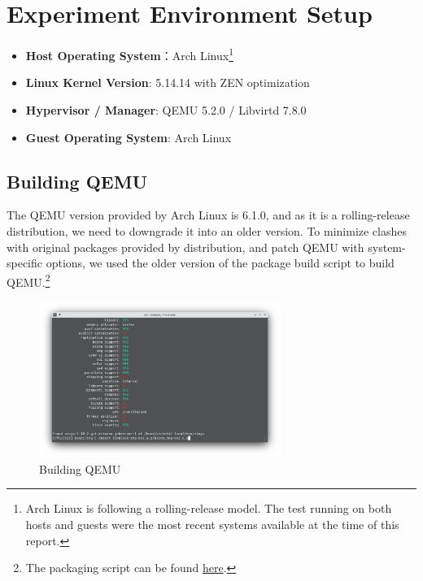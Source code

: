 \section{Experiment Environment Setup}

\begin{itemize}
    \item \textbf{Host Operating System}：Arch Linux\footnote{Arch Linux is following a rolling-release model. The test running on both hosts and guests were the most recent systems available at the time of this report.}
    \item \textbf{Linux Kernel Version}: 5.14.14 with ZEN optimization
    \item \textbf{Hypervisor / Manager}: QEMU 5.2.0 / Libvirtd 7.8.0
    \item \textbf{Guest Operating System}: Arch Linux
\end{itemize}

\subsection*{Building QEMU}

The QEMU version provided by Arch Linux is 6.1.0, and as it is a rolling-release distribution, we need to downgrade it into an older version. To minimize clashes with original packages provided by distribution, and patch QEMU with system-specific options, we used the older version of the package build script to build QEMU.\footnote{The packaging script can be found  \textcolor{blue}{\href{https://github.com/archlinux/svntogit-packages/tree/3049c9e5bcef3221532391bc719d07e9a4386a25}{here}}.}

\begin{figure}[ht]
    \centering
    \includegraphics[width=0.7\textwidth]{images/compiling-qemu.png}
    \caption{Building QEMU}
    \label{fig:compile}
\end{figure}

